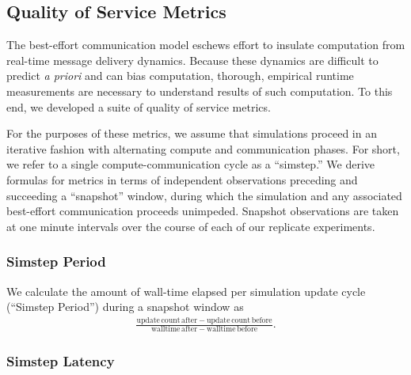 \subsection{Quality of Service Metrics} \label{sec:quality-of-service-metrics}

The best-effort communication model eschews effort to insulate computation from real-time message delivery dynamics.
Because these dynamics are difficult to predict \textit{a priori} and can bias computation, thorough, empirical runtime measurements are necessary to understand results of such computation.
To this end, we developed a suite of quality of service metrics.

For the purposes of these metrics, we assume that simulations proceed in an iterative fashion with alternating compute and communication phases.
For short, we refer to a single compute-communication cycle as a ``simstep.''
We derive formulas for metrics in terms of independent observations preceding and succeeding a ``snapshot'' window, during which the simulation and any associated best-effort communication proceeds unimpeded.
Snapshot observations are taken at one minute intervals over the course of each of our replicate experiments.

\subsubsection{Simstep Period} \label{moreno:sec:simstep-period-metric}

We calculate the amount of wall-time elapsed per simulation update cycle (``Simstep Period'') during a snapshot window as
\begin{align*}
\frac{
  \mathrm{update\,count\,after} - \mathrm{update\,count\,before}
}{
  \mathrm{walltime\,after} - \mathrm{walltime\,before}
}.
\end{align*}

\subsubsection{Simstep Latency} \label{moreno:sec:wall-time-latency-metric}


